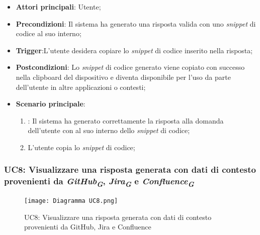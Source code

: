 \begin{itemize}
    \item \textbf{Attori principali}: Utente;
    \item \textbf{Precondizioni}: Il sistema ha generato una risposta valida con uno \emph{snippet} di codice al suo interno;
    \item \textbf{Trigger}:L'utente desidera copiare lo \emph{snippet} di codice inserito nella risposta;
    \item \textbf{Postcondizioni}: Lo \emph{snippet} di codice generato viene copiato con successo nella clipboard del dispositivo e diventa disponibile per l'uso da parte dell'utente in altre applicazioni o contesti;
    \item \textbf{Scenario principale}:
    \begin{enumerate}
        \item {}: Il sistema ha generato correttamente la risposta alla domanda dell'utente con al suo interno dello \emph{snippet} di codice;
        \item L'utente copia lo \emph{snippet} di codice;
    \end{enumerate}
\end{itemize}



\newpage
\hypertarget{UC8}{}
\subsubsection{UC8: Visualizzare una risposta generata con dati di contesto provenienti da 
\emph{GitHub}\textsubscript{\textbf{\textit{G}}}, \emph{Jira}\textsubscript{\textbf{\textit{G}}} e 
\emph{Confluence}\textsubscript{\textbf{\textit{G}}}}

\begin{figure}[h]
    \centering
    \texttt{[image: Diagramma UC8.png]}
    \caption{UC8: Visualizzare una risposta generata con dati di contesto provenienti da GitHub, Jira e Confluence}
\end{figure}

